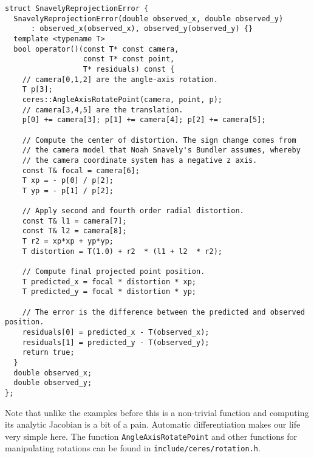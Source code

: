 \clearpage
\begin{verbatim}
struct SnavelyReprojectionError {
  SnavelyReprojectionError(double observed_x, double observed_y)
      : observed_x(observed_x), observed_y(observed_y) {}
  template <typename T>
  bool operator()(const T* const camera,
                  const T* const point,
                  T* residuals) const {
    // camera[0,1,2] are the angle-axis rotation.
    T p[3];
    ceres::AngleAxisRotatePoint(camera, point, p);
    // camera[3,4,5] are the translation.
    p[0] += camera[3]; p[1] += camera[4]; p[2] += camera[5];

    // Compute the center of distortion. The sign change comes from
    // the camera model that Noah Snavely's Bundler assumes, whereby
    // the camera coordinate system has a negative z axis.
    const T& focal = camera[6];
    T xp = - p[0] / p[2];
    T yp = - p[1] / p[2];

    // Apply second and fourth order radial distortion.
    const T& l1 = camera[7];
    const T& l2 = camera[8];
    T r2 = xp*xp + yp*yp;
    T distortion = T(1.0) + r2  * (l1 + l2  * r2);

    // Compute final projected point position.
    T predicted_x = focal * distortion * xp;
    T predicted_y = focal * distortion * yp;

    // The error is the difference between the predicted and observed position.
    residuals[0] = predicted_x - T(observed_x);
    residuals[1] = predicted_y - T(observed_y);
    return true;
  }
  double observed_x;
  double observed_y;
};
\end{verbatim}

Note that unlike the
examples before this is a non-trivial function and computing its
analytic Jacobian is a bit of a pain. Automatic differentiation makes
our life very simple here. The function \texttt{AngleAxisRotatePoint} and other functions for manipulating rotations can be found in \texttt{include/ceres/rotation.h}.  

